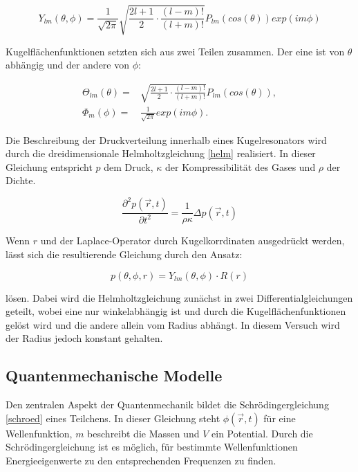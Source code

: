 \begin{equation}
    Y_{lm}(\theta,\phi) = \frac{1}{\sqrt{2\pi}} \sqrt{\frac{2l+1}{2}\cdot \frac{(l-m)!}{(l+m)!}} P_{lm}(cos(\theta))exp(im\phi)
    \label{kugel}
\end{equation}

Kugelflächenfunktionen setzten sich aus zwei Teilen zusammen. Der eine ist von $\theta$ 
abhängig und der andere von $\phi$:

\begin{align}
    \Theta_{lm}(\theta) =& \sqrt{\frac{2l+1}{2}\cdot \frac{(l-m)!}{(l+m)!}} P_{lm}(cos(\theta)),\\
    \Phi_{m}(\phi) =& \frac{1}{\sqrt{2\pi}} exp(im\phi).
\end{align}

Die Beschreibung der Druckverteilung innerhalb eines Kugelresonators wird durch die 
dreidimensionale Helmholtzgleichung \ref{helm} realisiert. In dieser Gleichung 
entspricht $p$ dem Druck, $\kappa$ der Kompressibilität des Gases und $\rho$ der Dichte.

\begin{equation}
    \frac{\partial^2 p(\vec{r},t)}{\partial t^2} = \frac{1}{\rho \kappa}  \Delta p(\vec{r},t)
    \label{helm}
\end{equation}

Wenn $r$ und der Laplace-Operator durch Kugelkorrdinaten ausgedrückt werden, lässt 
sich die resultierende Gleichung durch den Ansatz:

\begin{equation}
    p(\theta,\phi,r)= Y_{lm}(\theta,\phi) \cdot R(r)
    \label{druckprodukt}
\end{equation}

lösen. Dabei wird die Helmholtzgleichung zunächst in zwei Differentialgleichungen 
geteilt, wobei eine nur winkelabhängig ist und durch die Kugelflächenfunktionen 
gelöst wird und die andere allein vom Radius abhängt. In diesem Versuch wird 
der Radius jedoch konstant gehalten.

\subsection{Quantenmechanische Modelle}
Den zentralen Aspekt der Quantenmechanik bildet die Schrödingergleichung \ref{schroed}
eines Teilchens. In dieser Gleichung steht $\phi(\vec{r},t)$ für eine Wellenfunktion,
$m$ beschreibt die Massen und $V$ ein Potential.
Durch die Schrödingergleichung ist
es möglich, für bestimmte Wellenfunktionen Energieeigenwerte zu den 
entsprechenden Frequenzen zu finden. 

